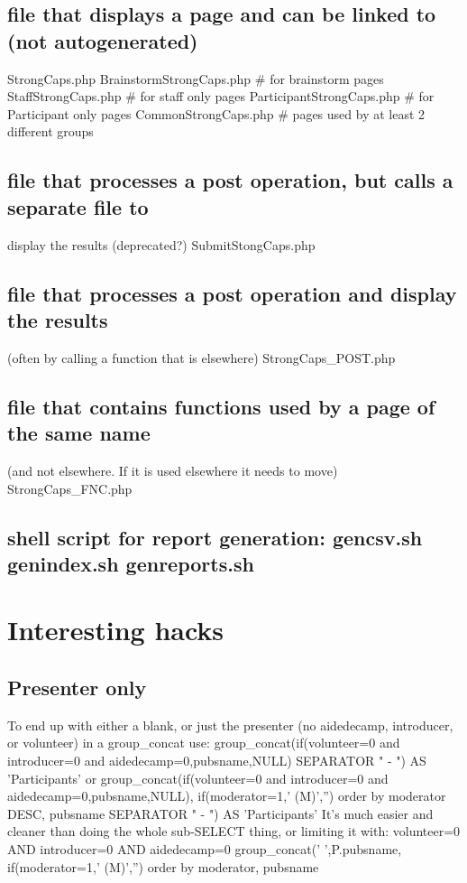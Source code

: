 \documentclass[captions=tablesignature]{scrartcl}
\begin{document}
\subsection{file that displays a page and can be linked to  (not autogenerated)}
\label{sec-1-5}
StrongCaps.php
BrainstormStrongCaps.php    \# for brainstorm pages
StaffStrongCaps.php    \# for staff only pages
ParticipantStrongCaps.php    \# for Participant only pages
CommonStrongCaps.php    \# pages used by at least 2 different groups
\subsection{file that processes a post operation, but calls a separate file to}
\label{sec-1-6}
display the results (deprecated?)
SubmitStongCaps.php
\subsection{file that processes a post operation and display the results}
\label{sec-1-7}
(often by calling a function that is elsewhere)
StrongCaps\_POST.php
\subsection{file that contains functions used by a page of the same name}
\label{sec-1-8}
(and not elsewhere.   If it is used elsewhere it needs to move)
StrongCaps\_FNC.php
\subsection{shell script for report generation: gencsv.sh genindex.sh genreports.sh}
\label{sec-1-9}

\section{Interesting hacks}
\label{sec-2}
\subsection{Presenter only}
\label{sec-2-1}
To end up with either a blank, or just the presenter (no aidedecamp, introducer, or volunteer) in a group\_concat use:
group\_concat(if(volunteer=0 and introducer=0 and aidedecamp=0,pubsname,NULL) SEPARATOR " - ") AS 'Participants' or
group\_concat(if(volunteer=0 and introducer=0 and aidedecamp=0,pubsname,NULL), if(moderator=1,' (M)','') order by moderator DESC, pubsname SEPARATOR " - ") AS 'Participants'
It's much easier and cleaner than doing the whole sub-SELECT thing, or limiting it with:
volunteer=0 AND introducer=0 AND aidedecamp=0
group\_concat(' ',P.pubsname, if(moderator=1,'  (M)','') order by moderator, pubsname
\end{document}
